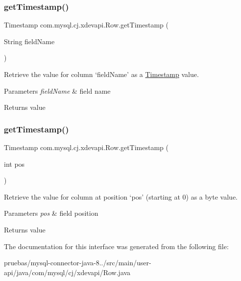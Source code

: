 \subsubsection{\texorpdfstring{get\+Timestamp()}{getTimestamp()}\hspace{0.1cm}{\footnotesize\ttfamily [1/2]}}
{\footnotesize\ttfamily Timestamp com.\+mysql.\+cj.\+xdevapi.\+Row.\+get\+Timestamp (\begin{DoxyParamCaption}\item[{String}]{field\+Name }\end{DoxyParamCaption})}

Retrieve the value for column `field\+Name' as a \mbox{\hyperlink{}{Timestamp}} value.


\begin{DoxyParams}{Parameters}
{\em field\+Name} & field name \\
\hline
\end{DoxyParams}
\begin{DoxyReturn}{Returns}
value 
\end{DoxyReturn}
\mbox{\label{interfacecom_1_1mysql_1_1cj_1_1xdevapi_1_1_row_a1787ae5b42c08a8a446d7ff7e6f8bd4e}} 
\subsubsection{\texorpdfstring{get\+Timestamp()}{getTimestamp()}\hspace{0.1cm}{\footnotesize\ttfamily [2/2]}}
{\footnotesize\ttfamily Timestamp com.\+mysql.\+cj.\+xdevapi.\+Row.\+get\+Timestamp (\begin{DoxyParamCaption}\item[{int}]{pos }\end{DoxyParamCaption})}

Retrieve the value for column at position `pos' (starting at 0) as a byte value.


\begin{DoxyParams}{Parameters}
{\em pos} & field position \\
\hline
\end{DoxyParams}
\begin{DoxyReturn}{Returns}
value 
\end{DoxyReturn}


The documentation for this interface was generated from the following file\+:\begin{DoxyCompactItemize}
\item 
pruebas/mysql-\/connector-\/java-\/8../src/main/user-\/api/java/com/mysql/cj/xdevapi/Row.\+java\end{DoxyCompactItemize}
